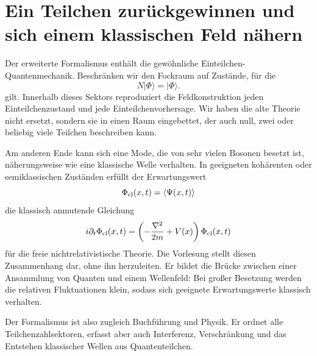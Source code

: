 \section{Ein Teilchen zurückgewinnen und sich einem klassischen Feld nähern}

Der erweiterte Formalismus enthält die gewöhnliche Einteilchen-Quantenmechanik. Beschränken wir den Fockraum auf Zustände, für die
\begin{equation}
N|\Phi\rangle=|\Phi\rangle.
\end{equation}
gilt. Innerhalb dieses Sektors reproduziert die Feldkonstruktion jeden Einteilchenzustand und jede Einteilchenvorhersage. Wir haben die alte Theorie nicht ersetzt, sondern sie in einen Raum eingebettet, der auch null, zwei oder beliebig viele Teilchen beschreiben kann.

Am anderen Ende kann sich eine Mode, die von sehr vielen Bosonen besetzt ist, näherungsweise wie eine klassische Welle verhalten. In geeigneten kohärenten oder semiklassischen Zuständen erfüllt der Erwartungswert
\begin{equation}
\Phi_{\rm cl}(x,t)=\langle\Psi(x,t)\rangle
\end{equation}
die klassisch anmutende Gleichung
\begin{equation}
i\partial_t\Phi_{\rm cl}(x,t)
=\left(-\frac{\nabla^2}{2m}+V(x)\right)\Phi_{\rm cl}(x,t)
\label{eq:l07-classical-schrodinger}
\end{equation}
für die freie nichtrelativistische Theorie. Die Vorlesung stellt diesen Zusammenhang dar, ohne ihn herzuleiten. Er bildet die Brücke zwischen einer Ansammlung von Quanten und einem Wellenfeld: Bei großer Besetzung werden die relativen Fluktuationen klein, sodass sich geeignete Erwartungswerte klassisch verhalten.

Der Formalismus ist also zugleich Buchführung und Physik. Er ordnet alle Teilchenzahlsektoren, erfasst aber auch Interferenz, Verschränkung und das Entstehen klassischer Wellen aus Quantenteilchen.

\begin{classroomqa}
\end{classroomqa}

